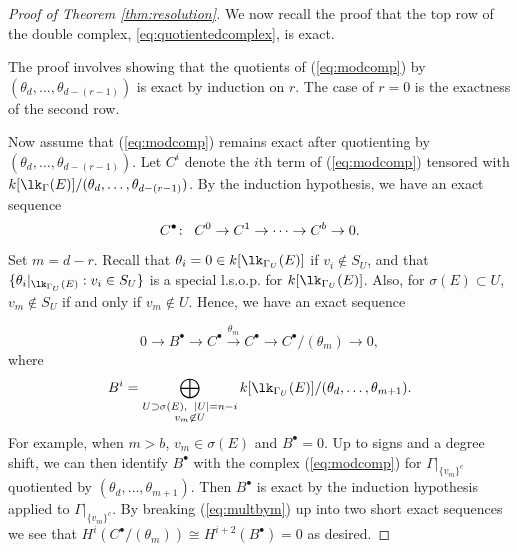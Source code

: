 \begin{proof}[Proof of Theorem \ref{thm:resolution}]
We now recall the proof that the top row of the double complex, \eqref{eq:quotientedcomplex}, is exact.
\begin{center}
\end{center}
The proof involves showing that the quotients of (\ref{eq:modcomp}) by $(\theta_{d}, \dotsc, \theta_{d - (r-1)})$ is exact by induction on $r$. The case of $r = 0$ is the exactness of the second row. 

Now assume that (\ref{eq:modcomp}) remains exact after quotienting by $(\theta_{d}, \dotsc, \theta_{d - (r-1)})$. Let $C^i$ denote the $i$th term of (\ref{eq:modcomp}) tensored with $k[\lk_{\Gamma}(E)]/(\theta_{d}, \dotsc, \theta_{d - (r - 1)})$. By the induction hypothesis, we have an exact sequence
\begin{equation*}
C^{\bullet}\colon \enskip  C^0 \to C^1 \to \dotsb \to C^{b} \to 0.
\end{equation*} 
Set $m = d - r$. Recall that 
$\theta_i = 0 \in k[\lk_{\Gamma_{U}}(E)]$ if $v_i \notin S_U$, and that $\{ \theta_i|_{\lk_{\Gamma_U}(E)} : v_i \in S_U \}$ is a special l.s.o.p. for $k[\lk_{\Gamma_{U}}(E)]$. 
Also, for $\sigma(E) \subset U$, $v_m \notin S_U$ if and only if $v_m \notin U$. Hence, we have an exact sequence

\begin{equation} \label{eq:multbym}
0 \to B^{\bullet} \to C^{\bullet} \xrightarrow{\theta_{m}} C^{\bullet} \to C^{\bullet}/(\theta_{m}) \to 0,
\end{equation}
where 
\[
B^{i} = \bigoplus_{\substack{U \supset \sigma(E), \enskip \vert U \vert = n-i \\ v_m \not \in U}}k[\lk_{\Gamma_U}(E)]/(\theta_{d}, \dotsc, \theta_{m + 1}).
\]
For example, when $m > b$, $v_m \in \sigma(E)$ and $B^{\bullet} = 0$.
Up to signs and a degree shift, we can then identify $ B^{\bullet}$ with the complex (\ref{eq:modcomp}) for $\Gamma|_{\{v_m\}^c}$ quotiented by $(\theta_{d}, \dotsc, \theta_{m + 1})$. Then $ B^{\bullet}$ is exact by the induction hypothesis applied to $\Gamma|_{\{v_m\}^c}$. By breaking (\ref{eq:multbym}) up into two short exact sequences we see that $H^i(C^{\bullet}/(\theta_{m})) \cong H^{i + 2}(B^{\bullet}) = 0$ as desired.


\end{proof}

